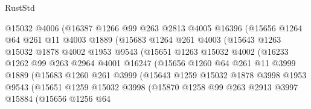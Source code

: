\begin{lexlean}{RustStd}
\begin{coremodule}
                    @15032
                    @4006
                    (@16387
                      @1266
                      @99
                      @263
                      @2813
                      @4005
                      @16396
                      (@15656
                        @1264
                        @64
                        @261
                        @11
                        @4003
                        @1889
                        (@15683
                          @1264
                          @261
                          @4003
                          (@15643
                            @1263
                            @15032
                            @1878
                            @4002
                            @1953
                            @9543
                            (@15651
                              @1263
                              @15032
                              @4002
                              (@16233
                                @1262
                                @99
                                @263
                                @2964
                                @4001
                                @16247
                                (@15656
                                  @1260
                                  @64
                                  @261
                                  @11
                                  @3999
                                  @1889
                                  (@15683
                                    @1260
                                    @261
                                    @3999
                                    (@15643
                                      @1259
                                      @15032
                                      @1878
                                      @3998
                                      @1953
                                      @9543
                                      (@15651
                                        @1259
                                        @15032
                                        @3998
                                        (@15870
                                          @1258
                                          @99
                                          @263
                                          @2913
                                          @3997
                                          @15884
                                          (@15656
                                            @1256
                                            @64

\end{coremodule}
\end{lexlean}
